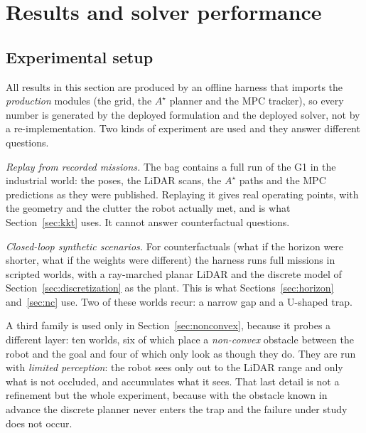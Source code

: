 \documentclass[11pt,a4paper]{article}
\newcommand{\astar}{$A^\star$}
\begin{document}
\section{Results and solver performance}
\label{sec:performance}

\subsection{Experimental setup}
\label{sec:setup}

All results in this section are produced by an offline harness that imports the \emph{production} modules
(the grid, the \astar{} planner and the MPC tracker), so every number is generated by the deployed
formulation and the deployed solver, not by a re-implementation. Two kinds of experiment are used and they
answer different questions.

\emph{Replay from recorded missions.} The bag \resBag{} contains a full run of the G1 in the industrial world:
the poses, the LiDAR scans, the \astar{} paths and the MPC predictions as they were published. Replaying it
gives real operating points, with the geometry and the clutter the robot actually met, and is what
Section~\ref{sec:kkt} uses. It cannot answer counterfactual questions.

\emph{Closed-loop synthetic scenarios.} For counterfactuals (what if the horizon were shorter, what if the
weights were different) the harness runs full missions in scripted worlds, with a ray-marched planar
LiDAR and the discrete model of Section~\ref{sec:discretization} as the plant. This is what
Sections~\ref{sec:horizon} and~\ref{sec:nc} use. Two of these worlds recur: a narrow gap
and a U-shaped trap.

A third family is used only in Section~\ref{sec:nonconvex}, because it probes a different layer: ten worlds,
six of which place a \emph{non-convex} obstacle between the robot and the goal and four of which only look as
though they do. They are run with \emph{limited perception}: the robot sees only out to the LiDAR range and
only what is not occluded, and accumulates what it sees. That last detail is not a refinement but the whole
experiment, because with the obstacle known in advance the discrete planner never enters the trap and the
failure under study does not occur.
\end{document}
